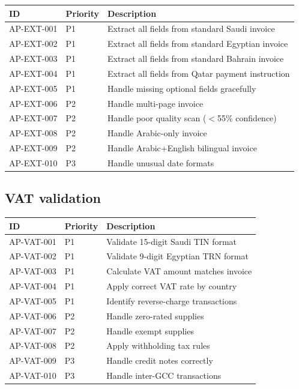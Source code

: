 \documentclass[11pt,a4paper,twoside]{report}
\begin{document}
\begin{tabularx}{\linewidth}{@{}l l X@{}}
\toprule
\textbf{ID} & \textbf{Priority} & \textbf{Description} \\ \midrule
AP-EXT-001 & P1 & Extract all fields from standard Saudi invoice \\
AP-EXT-002 & P1 & Extract all fields from standard Egyptian invoice \\
AP-EXT-003 & P1 & Extract all fields from standard Bahrain invoice \\
AP-EXT-004 & P1 & Extract all fields from Qatar payment instruction \\
AP-EXT-005 & P1 & Handle missing optional fields gracefully \\
AP-EXT-006 & P2 & Handle multi-page invoice \\
AP-EXT-007 & P2 & Handle poor quality scan ($<$55\% confidence) \\
AP-EXT-008 & P2 & Handle Arabic-only invoice \\
AP-EXT-009 & P2 & Handle Arabic+English bilingual invoice \\
AP-EXT-010 & P3 & Handle unusual date formats \\
\bottomrule
\end{tabularx}

\subsection{VAT validation}

\begin{tabularx}{\linewidth}{@{}l l X@{}}
\toprule
\textbf{ID} & \textbf{Priority} & \textbf{Description} \\ \midrule
AP-VAT-001 & P1 & Validate 15-digit Saudi TIN format \\
AP-VAT-002 & P1 & Validate 9-digit Egyptian TRN format \\
AP-VAT-003 & P1 & Calculate VAT amount matches invoice \\
AP-VAT-004 & P1 & Apply correct VAT rate by country \\
AP-VAT-005 & P1 & Identify reverse-charge transactions \\
AP-VAT-006 & P2 & Handle zero-rated supplies \\
AP-VAT-007 & P2 & Handle exempt supplies \\
AP-VAT-008 & P2 & Apply withholding tax rules \\
AP-VAT-009 & P3 & Handle credit notes correctly \\
AP-VAT-010 & P3 & Handle inter-GCC transactions \\
\bottomrule
\end{tabularx}
\end{document}
